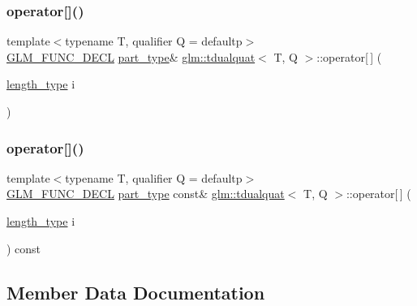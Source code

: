 \subsubsection{\texorpdfstring{operator[]()}{operator[]()}\hspace{0.1cm}{\footnotesize\ttfamily [1/2]}}
{\footnotesize\ttfamily template$<$typename T, qualifier Q = defaultp$>$ \\
\mbox{\hyperlink{setup_8hpp_ab2d052de21a70539923e9bcbf6e83a51}{G\+L\+M\+\_\+\+F\+U\+N\+C\+\_\+\+D\+E\+CL}} \mbox{\hyperlink{structglm_1_1tdualquat_ab18b8665bbd568f9bc93ef93ed475a47}{part\+\_\+type}}\& \mbox{\hyperlink{structglm_1_1tdualquat}{glm\+::tdualquat}}$<$ T, Q $>$\+::operator\mbox{[}$\,$\mbox{]} (\begin{DoxyParamCaption}\item[{\mbox{\hyperlink{structglm_1_1tdualquat_ad9fa4fd7f84d17bebd3efed6b5455d80}{length\+\_\+type}}}]{i }\end{DoxyParamCaption})}

\mbox{\label{structglm_1_1tdualquat_a8a6db73181f9b7cba58d95704734f8e4}} 
\subsubsection{\texorpdfstring{operator[]()}{operator[]()}\hspace{0.1cm}{\footnotesize\ttfamily [2/2]}}
{\footnotesize\ttfamily template$<$typename T, qualifier Q = defaultp$>$ \\
\mbox{\hyperlink{setup_8hpp_ab2d052de21a70539923e9bcbf6e83a51}{G\+L\+M\+\_\+\+F\+U\+N\+C\+\_\+\+D\+E\+CL}} \mbox{\hyperlink{structglm_1_1tdualquat_ab18b8665bbd568f9bc93ef93ed475a47}{part\+\_\+type}} const\& \mbox{\hyperlink{structglm_1_1tdualquat}{glm\+::tdualquat}}$<$ T, Q $>$\+::operator\mbox{[}$\,$\mbox{]} (\begin{DoxyParamCaption}\item[{\mbox{\hyperlink{structglm_1_1tdualquat_ad9fa4fd7f84d17bebd3efed6b5455d80}{length\+\_\+type}}}]{i }\end{DoxyParamCaption}) const}



\subsection{Member Data Documentation}
\mbox{\label{structglm_1_1tdualquat_a6e9bac4577ea5ff7e47104c183f3955a}} 
